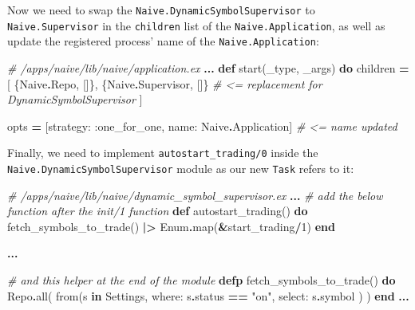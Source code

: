 \documentclass[
  oneside]{book}
\newenvironment{Shaded}{\begin{snugshade}}{\end{snugshade}}
\newcommand{\CommentTok}[1]{\textcolor[rgb]{0.56,0.35,0.01}{\textit{#1}}}
\newcommand{\ConstantTok}[1]{\textcolor[rgb]{0.00,0.00,0.00}{#1}}
\newcommand{\DecValTok}[1]{\textcolor[rgb]{0.00,0.00,0.81}{#1}}
\newcommand{\KeywordTok}[1]{\textcolor[rgb]{0.13,0.29,0.53}{\textbf{#1}}}
\newcommand{\NormalTok}[1]{#1}
\newcommand{\OperatorTok}[1]{\textcolor[rgb]{0.81,0.36,0.00}{\textbf{#1}}}
\newcommand{\StringTok}[1]{\textcolor[rgb]{0.31,0.60,0.02}{#1}}
\newcommand{\VariableTok}[1]{\textcolor[rgb]{0.00,0.00,0.00}{#1}}
\begin{document}
Now we need to swap the \texttt{Naive.DynamicSymbolSupervisor} to \texttt{Naive.Supervisor} in the \texttt{children} list of the \texttt{Naive.Application}, as well as update the registered process' name of the \texttt{Naive.Application}:

\begin{Shaded}
\begin{Highlighting}[]
\CommentTok{\# /apps/naive/lib/naive/application.ex}
  \OperatorTok{...}
  \KeywordTok{def}\NormalTok{ start(\_type, \_args) }\KeywordTok{do}
\NormalTok{    children }\OperatorTok{=}\NormalTok{ [}
\NormalTok{      \{}\ConstantTok{Naive}\OperatorTok{.}\ConstantTok{Repo}\NormalTok{, []\},}
\NormalTok{      \{}\ConstantTok{Naive}\OperatorTok{.}\ConstantTok{Supervisor}\NormalTok{, []\} }\CommentTok{\# \textless{}= replacement for DynamicSymbolSupervisor}
\NormalTok{    ]}

\NormalTok{    opts }\OperatorTok{=}\NormalTok{ [}\VariableTok{strategy:} \VariableTok{:one\_for\_one}\NormalTok{, }\VariableTok{name:} \ConstantTok{Naive}\OperatorTok{.}\ConstantTok{Application}\NormalTok{] }\CommentTok{\# \textless{}= name updated}
\end{Highlighting}
\end{Shaded}

Finally, we need to implement \texttt{autostart\_trading/0} inside the \texttt{Naive.DynamicSymbolSupervisor} module as our new \texttt{Task} refers to it:

\begin{Shaded}
\begin{Highlighting}[]
\CommentTok{\# /apps/naive/lib/naive/dynamic\_symbol\_supervisor.ex}
  \OperatorTok{...}
  \CommentTok{\# add the below function after the \textasciigrave{}init/1\textasciigrave{} function}
  \KeywordTok{def}\NormalTok{ autostart\_trading() }\KeywordTok{do}
\NormalTok{    fetch\_symbols\_to\_trade()}
    \OperatorTok{|\textgreater{}} \ConstantTok{Enum}\OperatorTok{.}\NormalTok{map(}\OperatorTok{\&}\NormalTok{start\_trading}\OperatorTok{/}\DecValTok{1}\NormalTok{)}
  \KeywordTok{end}
 
  \OperatorTok{...}

  \CommentTok{\# and this helper at the end of the module}
  \KeywordTok{defp}\NormalTok{ fetch\_symbols\_to\_trade() }\KeywordTok{do}
    \ConstantTok{Repo}\OperatorTok{.}\NormalTok{all(}
\NormalTok{      from(s }\KeywordTok{in} \ConstantTok{Settings}\NormalTok{,}
        \VariableTok{where:}\NormalTok{ s}\OperatorTok{.}\NormalTok{status }\OperatorTok{==} \StringTok{"on"}\NormalTok{,}
        \VariableTok{select:}\NormalTok{ s}\OperatorTok{.}\NormalTok{symbol}
\NormalTok{      )}
\NormalTok{    )}
  \KeywordTok{end}
  \OperatorTok{...}
\end{Highlighting}
\end{Shaded}
\end{document}
